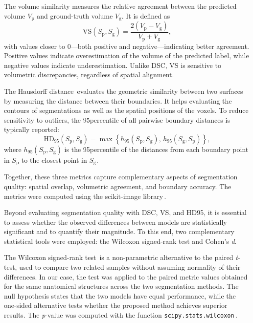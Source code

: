 The volume similarity measures the relative agreement between the predicted volume $V_\text{p}$ and ground-truth volume $V_\text{g}$. It is defined as
\begin{equation}
    \text{VS}(S_\text{p}, S_\text{g}) = \frac{2(V_\text{p} - V_\text{g})}{V_\text{p} + V_\text{g}},
\end{equation}
with values closer to \num{0}---both positive and negative---indicating better agreement. Positive values indicate overestimation of the volume of the predicted label, while negative values indicate underestimation. Unlike DSC, VS is sensitive to volumetric discrepancies, regardless of spatial alignment.

The Hausdorff distance\,\cite{Hausdorff1991, FeTA2021_review} evaluates the geometric similarity between two surfaces by measuring the distance between their boundaries. It helps evaluating the contours of segmentations as well as the spatial positions of the voxels. To reduce sensitivity to outliers, the 95\th percentile of all pairwise boundary distances is typically reported:
\begin{equation}
    \text{HD}_{95}(S_\text{p}, S_\text{g}) = \max \left\{ h_{95}(S_\text{p}, S_\text{g}), \, h_{95}(S_\text{g}, S_\text{p}) \right\},
\end{equation}
where $h_{95}(S_\text{p}, S_\text{g})$ is the 95\th percentile of the distances from each boundary point in $S_\text{p}$ to the closest point in $S_\text{g}$.

Together, these three metrics capture complementary aspects of segmentation quality: spatial overlap, volumetric agreement, and boundary accuracy. The metrics were computed using the scikit-image library\,\cite{Walt2014, scikit-image}.

Beyond evaluating segmentation quality with DSC, VS, and HD95, it is essential to assess whether the observed differences between models are statistically significant and to quantify their magnitude. To this end, two complementary statistical tools were employed: the Wilcoxon signed-rank test and Cohen's \textit{d}.

The Wilcoxon signed-rank test\,\cite{Wilcoxon1945} is a non-parametric alternative to the paired \textit{t}-test, used to compare two related samples without assuming normality of their differences. In our case, the test was applied to the paired metric values obtained for the same anatomical structures across the two segmentation methods. The null hypothesis states that the two models have equal performance, while the one-sided alternative tests whether the proposed method achieves superior results. The \textit{p}-value was computed with the function \verb|scipy.stats.wilcoxon|\,\cite{SciPy}.

